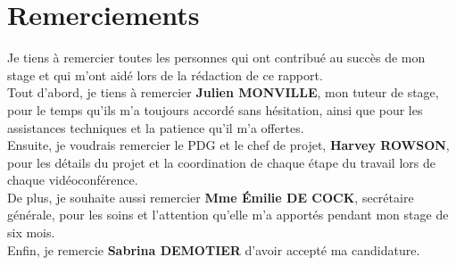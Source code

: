 \chapter*{Remerciements} %

Je tiens à remercier toutes les personnes qui ont contribué au succès de mon stage et qui m'ont aidé lors de la rédaction de ce rapport.  \\

Tout d'abord, je tiens à remercier \textbf{Julien MONVILLE}, mon tuteur de stage, pour le temps qu'ils m'a toujours accordé sans hésitation, ainsi que pour les assistances techniques et la patience qu'il m'a offertes. \\

Ensuite, je voudrais remercier le PDG et le chef de projet, \textbf{Harvey 
ROWSON}, pour les détails du projet et la coordination de chaque étape du travail lors de chaque vidéoconférence. \\
	
De plus, je souhaite aussi remercier \textbf{Mme Émilie DE COCK}, secrétaire générale, pour les soins et l'attention qu'elle m'a apportés pendant mon stage de six mois.  \\

Enfin, je remercie \textbf{Sabrina DEMOTIER} d'avoir accepté ma candidature.\\

